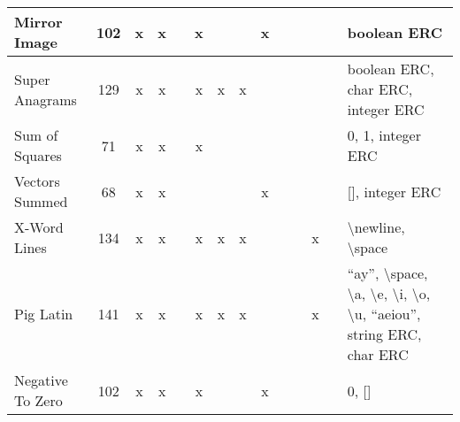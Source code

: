 \documentclass{sig-alternate}
\begin{document}
\begin{table*}
\begin{tabular}{|>{\raggedright}p{3.1cm}|c|ccccccccccc|>{\raggedright}p{5.5cm}|}
\hline
Mirror Image               & 102             & x    & x       &       & x       &      &        & x                  &                  &                   &       &            & boolean ERC                                                                                                                                                                                                                 \tabularnewline
\hline
Super Anagrams             & 129             & x    & x       &       & x       & x    & x      &                    &                  &                   &       &            & boolean ERC, char ERC, integer ERC                                                                                                                                                                                          \tabularnewline
\hline
Sum of Squares             & 71              & x    & x       &       & x       &      &        &                    &                  &                   &       &            & 0, 1, integer ERC                                                                                                                                                                                                           \tabularnewline
\hline
Vectors Summed             & 68              & x    & x       &       &         &      &        & x                  &                  &                   &       &            & {[}{]}, integer ERC                                                                                                                                                                                                         \tabularnewline
\hline
X-Word Lines               & 134             & x    & x       &       & x       & x    & x      &                    &                  &                   & x     &            & \textbackslash newline, \textbackslash space                                                                                                                                                                                \tabularnewline
\hline
Pig Latin                  & 141             & x    & x       &       & x       & x    & x      &                    &                  &                   & x     &            & ``ay'', \textbackslash space, \textbackslash a, \textbackslash e, \textbackslash i, \textbackslash o, \textbackslash u, ``aeiou'', string ERC, char ERC                                                                         \tabularnewline
\hline
Negative To Zero           & 102             & x    & x       &       & x       &      &        & x                  &                  &                   &       &            & 0, {[}{]}                                                                                                                                                                                                                   \tabularnewline

\end{tabular}
\end{table*}
\end{document}
